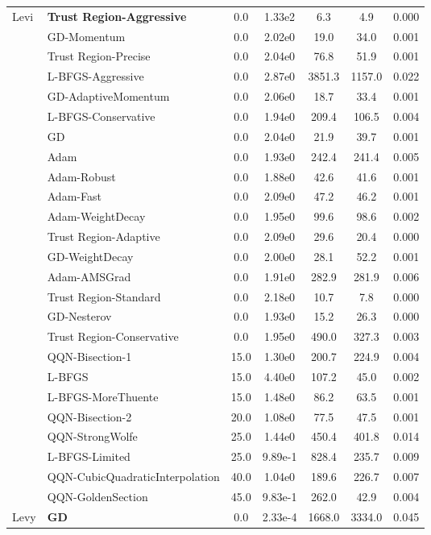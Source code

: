 \documentclass{article}
\begin{document}
\begin{table}[htbp]
{\begin{tabular}{p{2.5cm}p{2.5cm}*{5}{c}}
\midrule
\multirow{25}{*}{Levi} & \textbf{Trust Region-Aggressive} & 0.0 & 1.33e2 & 6.3 & 4.9 & 0.000 \\
 & GD-Momentum & 0.0 & 2.02e0 & 19.0 & 34.0 & 0.001 \\
 & Trust Region-Precise & 0.0 & 2.04e0 & 76.8 & 51.9 & 0.001 \\
 & L-BFGS-Aggressive & 0.0 & 2.87e0 & 3851.3 & 1157.0 & 0.022 \\
 & GD-AdaptiveMomentum & 0.0 & 2.06e0 & 18.7 & 33.4 & 0.001 \\
 & L-BFGS-Conservative & 0.0 & 1.94e0 & 209.4 & 106.5 & 0.004 \\
 & GD & 0.0 & 2.04e0 & 21.9 & 39.7 & 0.001 \\
 & Adam & 0.0 & 1.93e0 & 242.4 & 241.4 & 0.005 \\
 & Adam-Robust & 0.0 & 1.88e0 & 42.6 & 41.6 & 0.001 \\
 & Adam-Fast & 0.0 & 2.09e0 & 47.2 & 46.2 & 0.001 \\
 & Adam-WeightDecay & 0.0 & 1.95e0 & 99.6 & 98.6 & 0.002 \\
 & Trust Region-Adaptive & 0.0 & 2.09e0 & 29.6 & 20.4 & 0.000 \\
 & GD-WeightDecay & 0.0 & 2.00e0 & 28.1 & 52.2 & 0.001 \\
 & Adam-AMSGrad & 0.0 & 1.91e0 & 282.9 & 281.9 & 0.006 \\
 & Trust Region-Standard & 0.0 & 2.18e0 & 10.7 & 7.8 & 0.000 \\
 & GD-Nesterov & 0.0 & 1.93e0 & 15.2 & 26.3 & 0.000 \\
 & Trust Region-Conservative & 0.0 & 1.95e0 & 490.0 & 327.3 & 0.003 \\
 & QQN-Bisection-1 & 15.0 & 1.30e0 & 200.7 & 224.9 & 0.004 \\
 & L-BFGS & 15.0 & 4.40e0 & 107.2 & 45.0 & 0.002 \\
 & L-BFGS-MoreThuente & 15.0 & 1.48e0 & 86.2 & 63.5 & 0.001 \\
 & QQN-Bisection-2 & 20.0 & 1.08e0 & 77.5 & 47.5 & 0.001 \\
 & QQN-StrongWolfe & 25.0 & 1.44e0 & 450.4 & 401.8 & 0.014 \\
 & L-BFGS-Limited & 25.0 & 9.89e-1 & 828.4 & 235.7 & 0.009 \\
 & QQN-CubicQuadraticInterpolation & 40.0 & 1.04e0 & 189.6 & 226.7 & 0.007 \\
 & QQN-GoldenSection & 45.0 & 9.83e-1 & 262.0 & 42.9 & 0.004 \\
\midrule
\multirow{25}{*}{Levy} & \textbf{GD} & 0.0 & 2.33e-4 & 1668.0 & 3334.0 & 0.045 \\

\end{tabular}}
\end{table}
\end{document}
